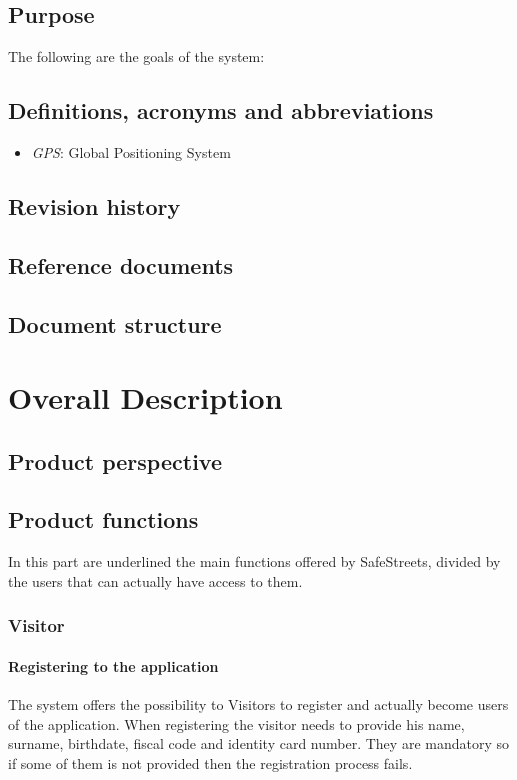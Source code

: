 \documentclass[a4paper]{report}
\begin{document}
\section{Purpose}
The following are the goals of the system:

\section{Definitions, acronyms and abbreviations}
\begin{itemize}
\item \textit{GPS}: Global Positioning System
\end{itemize}
\section{Revision history}
\lipsum[1]
\section{Reference documents}
\lipsum[1]
\section{Document structure}
\lipsum[1]

\chapter{Overall Description}
\section{Product perspective}
\lipsum[1]
\section{Product functions}

In this part are underlined the main functions offered by SafeStreets, divided by the users that can actually have access to them.

\subsection{Visitor}

\subsubsection{Registering to the application}

The system offers the possibility to Visitors to register and actually become users of the application. When registering the visitor needs to provide his name, surname, birthdate, fiscal code and identity card number. They are mandatory so if some of them is not provided then the registration process fails.
 
\end{document}
